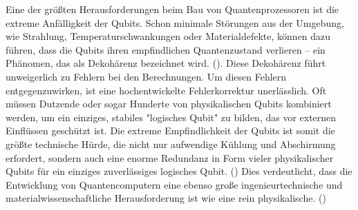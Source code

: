 Eine der größten Herausforderungen beim Bau von Quantenprozessoren ist die extreme Anfälligkeit der Qubits. Schon minimale Störungen aus der Umgebung, wie Strahlung, Temperaturschwankungen oder Materialdefekte, können dazu führen, dass die Qubits ihren empfindlichen Quantenzustand verlieren – ein Phänomen, das als Dekohärenz bezeichnet wird. (\cite{WasIstQuantencomputing}). Diese Dekohärenz führt unweigerlich zu Fehlern bei den Berechnungen. Um diesen Fehlern entgegenzuwirken, ist eine hochentwickelte Fehlerkorrektur unerlässlich. Oft müssen Dutzende oder sogar Hunderte von physikalischen Qubits kombiniert werden, um ein einziges, stabiles "logisches Qubit" zu bilden, das vor externen Einflüssen geschützt ist. Die extreme Empfindlichkeit der Qubits ist somit die größte technische Hürde, die nicht nur aufwendige Kühlung und Abschirmung erfordert, sondern auch eine enorme Redundanz in Form vieler physikalischer Qubits für ein einziges zuverlässiges logisches Qubit. (\cite{QuantencomputerWikipedia}) Dies verdeutlicht, dass die Entwicklung von Quantencomputern eine ebenso große ingenieurtechnische und materialwissenschaftliche Herausforderung ist wie eine rein physikalische. (\cite{wissenschaftenMitSupraleitendenQubits2021})
